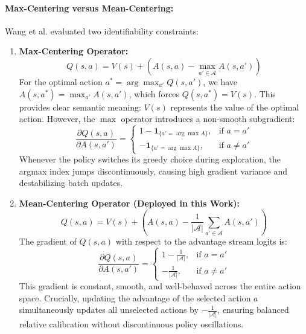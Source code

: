\documentclass[12pt,a4paper,oneside]{report}
\begin{document}
\paragraph{Max-Centering versus Mean-Centering:}
Wang et al. \cite{wang2016dueling} evaluated two identifiability constraints:
\begin{enumerate}
    \item \textbf{Max-Centering Operator:}
    \begin{equation}
    Q(s, a) = V(s) + \left( A(s, a) - \max_{a' \in \mathcal{A}} A(s, a') \right)
    \end{equation}
    For the optimal action $a^* = \arg\max_{a'} Q(s, a')$, we have $A(s, a^*) = \max_{a'} A(s, a')$, which forces $Q(s, a^*) = V(s)$. This provides clear semantic meaning: $V(s)$ represents the value of the optimal action. However, the $\max$ operator introduces a non-smooth subgradient:
    \begin{equation}
    \frac{\partial Q(s, a)}{\partial A(s, a')} = 
    \begin{cases}
    1 - \mathbf{1}_{\{a' = \arg\max A\}}, & \text{if } a = a' \\
    -\mathbf{1}_{\{a' = \arg\max A\}}, & \text{if } a \neq a'
    \end{cases}
    \end{equation}
    Whenever the policy switches its greedy choice during exploration, the argmax index jumps discontinuously, causing high gradient variance and destabilizing batch updates.
    
    \item \textbf{Mean-Centering Operator (Deployed in this Work):}
    \begin{equation}
    Q(s, a) = V(s) + \left( A(s, a) - \frac{1}{|\mathcal{A}|} \sum_{a' \in \mathcal{A}} A(s, a') \right)
    \end{equation}
    The gradient of $Q(s, a)$ with respect to the advantage stream logits is:
    \begin{equation}
    \frac{\partial Q(s, a)}{\partial A(s, a')} = 
    \begin{cases}
    1 - \frac{1}{|\mathcal{A}|}, & \text{if } a = a' \\
    -\frac{1}{|\mathcal{A}|}, & \text{if } a \neq a'
    \end{cases}
    \end{equation}
    This gradient is constant, smooth, and well-behaved across the entire action space. Crucially, updating the advantage of the selected action $a$ simultaneously updates all unselected actions by $-\frac{1}{|\mathcal{A}|}$, ensuring balanced relative calibration without discontinuous policy oscillations.
\end{enumerate}
\end{document}

